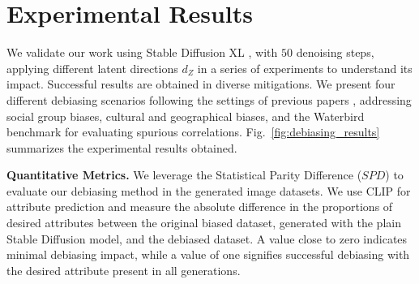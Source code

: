 \section{Experimental Results}
\label{mitigation_results_section}


We validate our work using Stable Diffusion XL \cite{rombach2022highresolution}, with $50$ denoising steps, applying different latent directions $d_{Z}$ in a series of experiments to understand its impact. Successful results are obtained in diverse mitigations. We present four different debiasing scenarios following the settings of previous papers \cite{chuang2023debiasing, zhang2023itigen, jain2021imperfect, friedrich2023fair}, addressing social group biases, cultural and geographical biases, and the Waterbird \cite{sagawa2020distributionally} benchmark for evaluating spurious correlations. Fig.~\ref{fig:debiasing_results} summarizes the experimental results obtained.

\noindent\textbf{Quantitative Metrics.} We leverage the Statistical Parity Difference ($SPD$) \cite{dwork2011fairness} to evaluate our debiasing method in the generated image datasets. We use CLIP for attribute prediction and measure the absolute difference in the proportions of desired attributes between the original biased dataset, generated with the plain Stable Diffusion model, and the debiased dataset. A value close to zero indicates minimal debiasing impact, while a value of one signifies successful debiasing with the desired attribute present in all generations. 

